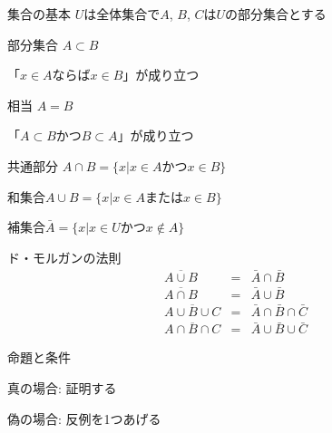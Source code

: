 \documentclass[aspectratio=169, 12pt]{beamer} %
\begin{document}
\begin{frame}{集合の基本}
    $U$は全体集合で$A$, $B$, $C$は$U$の部分集合とする \par
    部分集合 $A\subset B$ \par
    \begin{center}
        「$x \in A$ならば$x\in B$」が成り立つ\par
    \end{center}
    相当 $A=B$ \par
    \begin{center}
        「$A\subset B$かつ$B\subset A$」が成り立つ \par
    \end{center}

    共通部分 $A\cap B = \{x|x\in A かつ x \in B\}$ \par
    和集合\space\space\space\space $A\cup B = \{x|x\in A または x \in B \}$ \par
    補集合\space\space\space\space\space\space\space\space\space\space $\bar{A}=\{x|x\in U かつ x\notin A\}$
\end{frame}
\begin{frame}{ド・モルガンの法則}
    \begin{eqnarray*}
        \overline{A\cup B}&=&\bar{A}\cap \bar{B} \\
        \overline{A\cap B}&=&\bar{A}\cup \bar{B} \\
        \overline{A\cup B\cup C}&=&\bar{A}\cap\bar{B}\cap\bar{C} \\
        \overline{A\cap B\cap C}&=&\bar{A}\cup\bar{B}\cup\bar{C}
    \end{eqnarray*}
\end{frame}
\begin{frame}{命題と条件}
    \begin{center}
        真の場合: 証明する \par
        偽の場合: 反例を1つあげる
    \end{center}
\end{frame}
\end{document}
